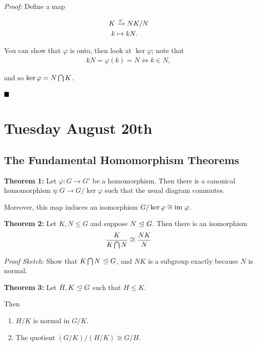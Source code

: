 \emph{Proof:} Define a map

\begin{align*}
K &\xrightarrow{\varphi} NK/N \\
k &\mapsto kN
.\end{align*}

You can show that \(\varphi\) is onto, then look at \(\ker \varphi\);
note that
\begin{align*}
kN = \varphi(k) = N \iff k \in N
,\end{align*}

and so \(\ker \varphi = N \bigcap K\).

\(\qed\)

\hypertarget{tuesday-august-20th}{%
\section{Tuesday August 20th}\label{tuesday-august-20th}}

\hypertarget{the-fundamental-homomorphism-theorems}{%
\subsection{The Fundamental Homomorphism
Theorems}\label{the-fundamental-homomorphism-theorems}}

\textbf{Theorem 1:} Let \(\varphi: G \to G'\) be a homomorphism. Then
there is a canonical homomorphism \(\eta: G \to G/\ker \varphi\) such
that the usual diagram commutes.

Moreover, this map induces an isomorphism
\(G /\ker \varphi \cong {\text{im}~} \varphi\).

\textbf{Theorem 2:} Let \(K, N \leq G\) and suppose \(N {~\trianglelefteq~} G\).
Then there is an isomorphism
\begin{align*}
\frac K {K \bigcap N} \cong \frac {NK} {N}
\end{align*}

\emph{Proof Sketch:} Show that \(K \bigcap N {~\trianglelefteq~} G\), and \(NK\)
is a subgroup exactly because \(N\) is normal.

\textbf{Theorem 3:} Let \(H, K {~\trianglelefteq~} G\) such that \(H \leq K\).

Then

\begin{enumerate}
\def\labelenumi{\arabic{enumi}.}
\item
  \(H/K\) is normal in \(G/K\).
\item
  The quotient \((G/K) / (H/K) \cong G/H\).
\end{enumerate}


